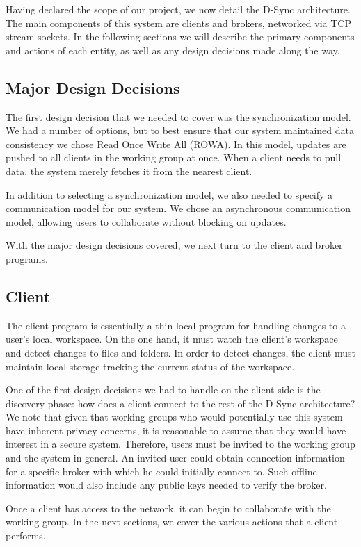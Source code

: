 Having declared the scope of our project,
we now detail the D-Sync architecture.
The main components of this system are clients and brokers,
networked via TCP stream sockets.
In the following sections we will describe the primary
components and actions of each entity,
as well as any design decisions made along the way.

\subsection{Major Design Decisions}
The first design decision that we needed to cover was the synchronization
model.
We had a number of options, but to best ensure
that our system maintained data consistency
we chose Read Once Write All (ROWA). In this model,
updates are pushed to all clients in the working group
at once.
When a client needs to pull data,
the system merely fetches it from the nearest client.

In addition to selecting a synchronization model,
we also needed to specify a communication model for our system.
We chose an asynchronous communication model,
allowing users to collaborate without blocking on updates.


With the major design decisions covered, we next turn to 
the client and broker programs.

\subsection{Client}
The client program is essentially a thin local program
for handling changes to a user's local workspace.
On the one hand, it must watch the client's workspace
and detect changes to files and folders.
In order to detect changes,
the client must maintain local storage tracking
the current status of the workspace.

One of the first design decisions we had to handle on the client-side
is the discovery phase: how does a client connect to the rest of the 
D-Sync architecture?
We note that given that working groups who would potentially
use this system have inherent privacy concerns,
it is reasonable to assume that they would have interest in a secure system.
Therefore, users must be invited to the working group and the system in general.
An invited user could obtain connection information for a specific broker
with which he could initially connect to.
Such offline information would also include any public keys needed
to verify the broker.

Once a client has access to the network,
it can begin to collaborate with the working group.
In the next sections, we cover the various actions
that a client performs.

